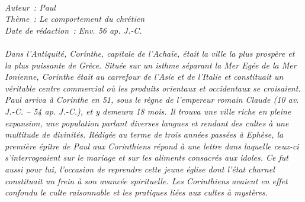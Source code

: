 \BFont
\noindent\hrulefill
{\footnotesize
\textit{
\bigskip
{\centering{}
\\Auteur~: Paul
\\Thème~: Le comportement du chrétien
\\Date de rédaction~: Env. 56 ap. J.-C.\\}
}
\textit{
\\Dans l'Antiquité, Corinthe, capitale de l'Achaïe, était la ville la plus prospère et la plus puissante de Grèce. Située sur un isthme séparant la Mer Egée de la Mer Ionienne, Corinthe était au carrefour de l'Asie et de l'Italie et constituait un véritable centre commercial où les produits orientaux et occidentaux se croisaient.
\\Paul arriva à Corinthe en 51, sous le règne de l'empereur romain Claude (10 av. J.-C. – 54 ap. J.-C.), et y demeura 18 mois. Il trouva une ville riche en pleine expansion, une population parlant diverses langues et rendant des cultes à une multitude de divinités. Rédigée au terme de trois années passées à Ephèse, la première épître de Paul aux Corinthiens répond à une lettre dans laquelle ceux-ci s'interrogeaient sur le mariage et sur les aliments consacrés aux idoles. Ce fut aussi pour lui, l'occasion de reprendre cette jeune église dont l'état charnel constituait un frein à son avancée spirituelle. Les Corinthiens avaient en effet confondu le culte raisonnable et les pratiques liées aux cultes à mystères.\bigskip
}
}
\par\nobreak\noindent\hrulefill
